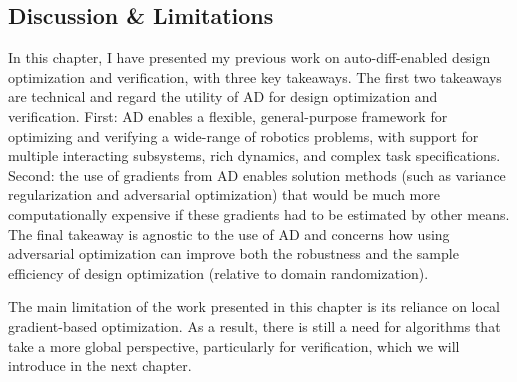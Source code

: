 \subsection{Discussion \& Limitations}

In this chapter, I have presented my previous work on auto-diff-enabled design optimization and verification, with three key takeaways. The first two takeaways are technical and regard the utility of AD for design optimization and verification. First: AD enables a flexible, general-purpose framework for optimizing and verifying a wide-range of robotics problems, with support for multiple interacting subsystems, rich dynamics, and complex task specifications. Second: the use of gradients from AD enables solution methods (such as variance regularization and adversarial optimization) that would be much more computationally expensive if these gradients had to be estimated by other means. The final takeaway is agnostic to the use of AD and concerns how using adversarial optimization can improve both the robustness and the sample efficiency of design optimization (relative to domain randomization).

The main limitation of the work presented in this chapter is its reliance on local gradient-based optimization. As a result, there is still a need for algorithms that take a more global perspective, particularly for verification, which we will introduce in the next chapter.




